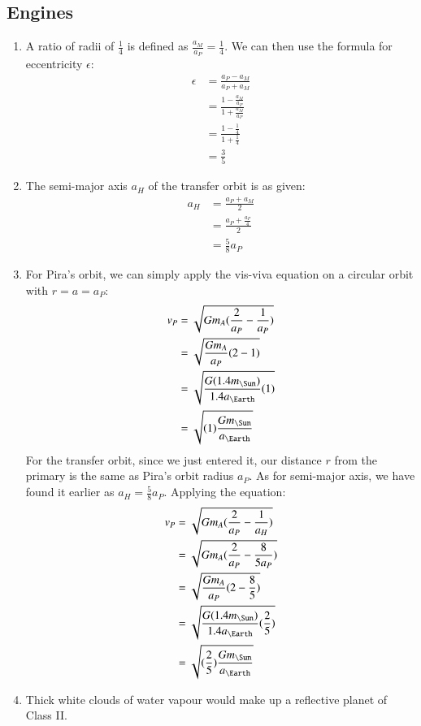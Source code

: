 \documentclass{article}
\begin{document}
\subsection{Engines}
\begin{enumerate}
\item A ratio of radii of $\frac{1}{4}$ is defined as $\frac{a_M}{a_P}=\frac{1}{4}$. We can then use the formula for eccentricity $\epsilon$:
\begin{equation}
\begin{split}
\epsilon&=\frac{a_P-a_M}{a_P+a_M}\\
&=\frac{1-\frac{a_M}{a_P}}{1+\frac{a_M}{a_P}}\\
&=\frac{1-\frac{1}{4}}{1+\frac{1}{4}}\\
&=\frac{3}{5}
\end{split}
\end{equation}
\item The semi-major axis $a_H$ of the transfer orbit is as given:
\begin{equation}
\begin{split}
a_H&=\frac{a_P+a_M}{2}\\
&=\frac{a_P+\frac{a_P}{4}}{2}\\
&=\frac{5}{8}a_P
\end{split}
\end{equation}
\item For Pira's orbit, we can simply apply the vis-viva equation on a circular orbit with $r=a=a_P$:
\begin{equation}
\begin{split}
v_P&=\sqrt{Gm_A(\frac{2}{a_P}-\frac{1}{a_P})}\\
&=\sqrt{\frac{Gm_A}{a_P}(2-1)}\\
&=\sqrt{\frac{G(1.4m_\Sun)}{1.4a_\Earth}(1)}\\
&=\sqrt{(1)\frac{Gm_\Sun}{a_\Earth}}
\end{split}
\end{equation}
For the transfer orbit, since we just entered it, our distance $r$ from the primary is the same as Pira's orbit radius $a_P$. As for semi-major axis, we have found it earlier as $a_H=\frac{5}{8}a_P$. Applying the equation:
\begin{equation}
\begin{split}
v_P&=\sqrt{Gm_A(\frac{2}{a_P}-\frac{1}{a_H})}\\
&=\sqrt{Gm_A(\frac{2}{a_P}-\frac{8}{5a_P})}\\
&=\sqrt{\frac{Gm_A}{a_P}(2-\frac{8}{5})}\\
&=\sqrt{\frac{G(1.4m_\Sun)}{1.4a_\Earth}(\frac{2}{5})}\\
&=\sqrt{(\frac{2}{5})\frac{Gm_\Sun}{a_\Earth}}
\end{split}
\end{equation}
\item Thick white clouds of water vapour would make up a reflective planet of Class II.
\end{enumerate}
\end{document}
